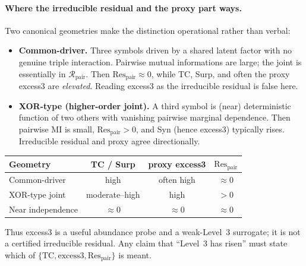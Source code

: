 \documentclass[11pt,a4paper]{article}
\begin{document}
\paragraph{Where the irreducible residual and the proxy part ways.}
Two canonical geometries make the distinction operational rather than
verbal:
\begin{itemize}[leftmargin=*,itemsep=3pt]
  \item \textbf{Common-driver.} Three symbols driven by a shared latent
  factor with no genuine triple interaction. Pairwise mutual informations
  are large; the joint is essentially in $\mathcal{R}_{\mathrm{pair}}$.
  Then $\mathrm{Res}_{\mathrm{pair}}\approx 0$, while TC, Surp, and often
  the proxy excess3 are \emph{elevated}. Reading excess3 as the
  irreducible residual is false here.
  \item \textbf{XOR-type (higher-order joint).} A third symbol is (near)
  deterministic function of two others with vanishing pairwise
  marginal dependence. Then pairwise MI is small,
  $\mathrm{Res}_{\mathrm{pair}}>0$, and Syn (hence excess3) typically
  rises. Irreducible residual and proxy agree directionally.
\end{itemize}
\begin{center}
\small
\begin{tabular}{@{}lccc@{}}
\toprule
Geometry & TC / Surp & proxy excess3 & $\mathrm{Res}_{\mathrm{pair}}$ \\
\midrule
Common-driver & high & often high & $\approx 0$ \\
XOR-type joint & moderate--high & high & $>0$ \\
Near independence & $\approx 0$ & $\approx 0$ & $\approx 0$ \\
\bottomrule
\end{tabular}
\end{center}
\vspace{0.25em}
\noindent
Thus excess3 is a useful abundance probe and a weak-Level~3 surrogate; it
is not a certified irreducible residual. Any claim that ``Level~3 has
risen'' must state which of
$\{\mathrm{TC},\mathrm{excess3},\mathrm{Res}_{\mathrm{pair}}\}$ is meant.
\end{document}
